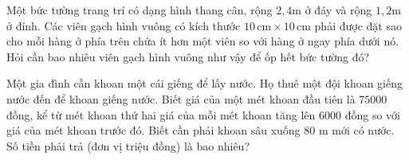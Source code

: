 \begin{ex}%
	Một bức tường trang trí có dạng hình thang cân, rộng  $2{,}4$m ở đáy và rộng $1{,}2$m ở đỉnh. Các viên gạch hình vuông có kích thước $10\, \text{cm}\times 10\, \text{cm}$ phải được đặt sao cho mỗi hàng ở phía trên chứa ít hơn một viên so với hàng ở ngay phía dưới nó. Hỏi cần bao nhiêu viên gạch hình vuông như vậy để ốp hết bức tường đó?
\end{ex}

\begin{ex}%
	Một gia đình cần khoan một cái giếng để lấy nước. Họ thuê một đội khoan giếng nước đến để khoan giếng nước. Biết giá của một mét khoan đầu tiên là $75000$ đồng, kể từ mét khoan thứ hai giá của mỗi mét khoan tăng lên $6000$ đồng so với giá của mét khoan trước đó. Biết cần phải khoan sâu xuống $80$ m mới có nước. Số tiền phải trả (đơn  vị triệu đồng) là bao nhiêu?
\end{ex}

